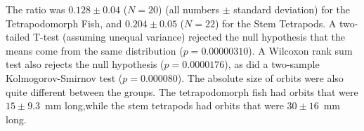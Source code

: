 The ratio was $0.128 \pm 0.04$  ($N=20$) (all numbers $\pm$ standard deviation) for the Tetrapodomorph Fish, and $0.204 \pm  0.05$ ($N=22$) for the Stem Tetrapods. A two-tailed  T-test (assuming unequal variance) rejected the null hypothesis that the means come from the same distribution ($p = 0.00000310$). A Wilcoxon rank sum test also rejects the null hypothesis ($p = 0.0000176$), as did a two-sample Kolmogorov-Smirnov test ($p = 0.000080$).  The absolute size of orbits were also quite different between the groups. The tetrapodomorph fish had orbits that were $15 \pm 9.3$~mm long,while the stem tetrapods had orbits that were $30 \pm 16$~mm long.